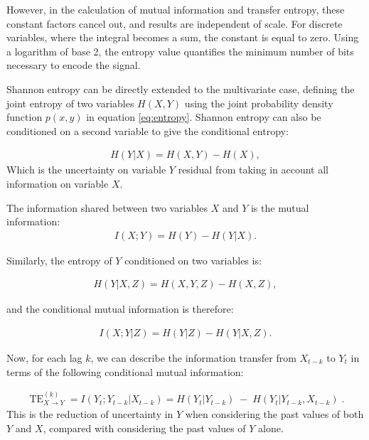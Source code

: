 \documentclass[]{rsos}%
\begin{document}
{However, in the calculation of mutual information and  transfer entropy, these constant factors cancel out, and results are independent of scale.
For discrete variables, where the integral becomes a sum, the constant is equal to zero. Using a logarithm of base 2, the entropy value quantifies the minimum number of bits necessary to encode the signal. 

 Shannon entropy can be directly extended to the multivariate case, defining the joint entropy of two variables $H(X,Y)$ using the joint probability density function $p(x,y)$ in equation \ref{eq:entropy}. Shannon entropy can also be conditioned on a second variable to give the conditional entropy:

  \begin{eqnarray}
    \label{eq:conditional_entropy_2D}
    H(Y | X) = H(X,Y) - H(X) ,
  \end{eqnarray}
Which is the uncertainty on variable $Y$ residual from taking in account all information on variable $X$. 

 The information shared between two variables $X$ and $Y$ is the mutual information:
  \begin{eqnarray}
    \label{eq:mutual_information}
    I(X;Y) = H(Y) - H(Y | X) .
  \end{eqnarray}
 
 Similarly, the entropy of $Y$ conditioned on two variables is:

  \begin{eqnarray}
    \label{eq:conditional_entropy_3D}
    H(Y | X, Z) = H(X,Y,Z) - H(X, Z) ,
  \end{eqnarray}
  
  and the conditional mutual information is therefore:

  \begin{eqnarray}
    \label{eq:conditional_mutual_information}
    I(X;Y|Z) = H(Y|Z) - H(Y | X, Z) .
  \end{eqnarray}

  Now, for each lag $k$, we can describe the information transfer from $X_{t-k}$ to $Y_t$ in terms of the following conditional mutual information:

  \begin{eqnarray}
      \label{eq:TE}
      \operatorname{TE}^{(k)}_{\textbf{}X \rightarrow Y} = I(Y_t ;Y_{t-k} | X_{t-k} ) = H(Y_t | Y_{t-k}) \; - \;  H(Y_t | Y_{t-k}, X_{t-k} ) \;.
  \end{eqnarray}
 This is the reduction of uncertainty in $Y$ when considering the past values of both $Y$ and $X$, compared with considering the past values of $Y$ alone. 

}
\end{document}
